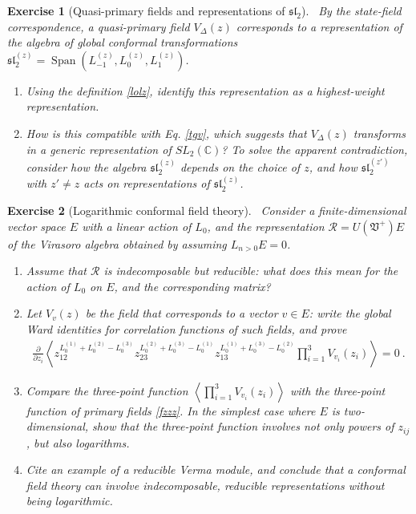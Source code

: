 \documentclass[12pt, a4paper, notitlepage, twoside]{report}
\numberwithin{equation}{section}
\theoremstyle{break}
\newtheorem{exo}{Exercise}[chapter]
\begin{document}
\begin{exo}[Quasi-primary fields and representations of $\mathfrak{sl}_2$]
 ~\label{exoqp}
By the state-field correspondence, a quasi-primary field $V_\Delta(z)$ corresponds to a representation of the algebra of global conformal transformations $\mathfrak{sl}_2^{(z)} = \operatorname{Span}(L_{-1}^{(z)},L_0^{(z)},L_1^{(z)})$.
\begin{enumerate}
 \item 
Using the definition \eqref{lolz}, identify this representation as a highest-weight representation.
\item
How is this compatible with Eq. \eqref{tgv}, which suggests that $V_\Delta(z)$ transforms in a generic representation of $SL_2({\mathbb{C}})$? To solve the apparent contradiction, consider how the algebra $\mathfrak{sl}_2^{(z)}$ depends on the choice of $z$, and how $\mathfrak{sl}_2^{(z')}$ with $z'\neq z$ acts on representations of $\mathfrak{sl}_2^{(z)}$.
\end{enumerate}
\end{exo}

\begin{exo}[Logarithmic conformal field theory]
 ~\label{exolog}
Consider a finite-dimensional vector space $E$ with a linear action of $L_0$, and the representation $\mathcal{R}=U(\mathfrak{V}^+)E$ of the Virasoro algebra obtained by assuming $L_{n>0}E=0$.
\begin{enumerate}
 \item 
Assume that $\mathcal{R}$ is indecomposable but reducible: what does this mean for the action of $L_0$ on $E$, and the corresponding matrix? 
\item
Let $V_v(z)$ be the field that corresponds to a vector $v\in E$: write the global Ward identities for correlation functions of such fields, and prove 
\begin{align}
 {\frac{\partial}{\partial z_i}} \left\langle z_{12}^{L_0^{(1)}+L_0^{(2)}-L_0^{(3)}} z_{23}^{L_0^{(2)}+L_0^{(3)}-L_0^{(1)}} z_{13}^{L_0^{(1)}+L_0^{(3)}-L_0^{(2)}} \prod_{i=1}^3 V_{v_i}(z_i)\right\rangle = 0\ .
\end{align}
\item
Compare the three-point function $\left\langle  \prod_{i=1}^3 V_{v_i}(z_i)\right\rangle$ with the three-point function  of primary fields \eqref{fzzz}.
In the simplest case where $E$ is two-dimensional, show that the three-point function involves not only powers of $z_{ij}$, but also logarithms.
\item
Cite an example of a reducible Verma module, and conclude that 
a conformal field theory can involve indecomposable, reducible representations without being logarithmic. 
\end{enumerate}
\end{exo}
\end{document}
